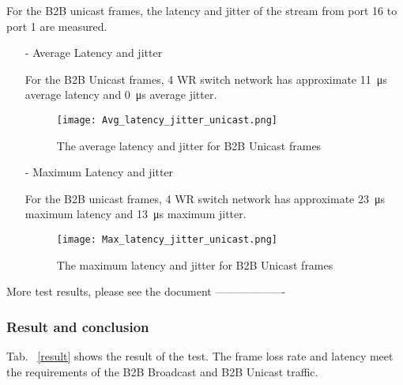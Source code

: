 \begin{itemize}
For the B2B unicast frames, the latency and jitter of the stream from port 16 to port 1 are measured. 

		\begin{itemize}
    		\item[-] Average Latency and jitter

For the B2B Unicast frames, 4 WR switch network has approximate \SI{11}{\us} average latency and \SI{0}{\us} average jitter. 

\begin{figure}[!htb]
   \centering   
   \texttt{[image: Avg\_latency\_jitter\_unicast.png]}
   \caption{The average latency and jitter for B2B Unicast frames}
   \label{Avg_latency_jitter_unicast}
\end{figure}

			\item[-] Maximum Latency and jitter

For the B2B unicast frames, 4 WR switch network has approximate \SI{23}{\us} maximum latency and \SI{13}{\us} maximum jitter.

\begin{figure}[!htb]
   \centering   
   \texttt{[image: Max\_latency\_jitter\_unicast.png]}
   \caption{The maximum latency and jitter for B2B Unicast frames}
   \label{Max_latency_jitter_unicast}
\end{figure}

		\end{itemize}
\end{itemize}

More test results, please see the document -------------------

\subsubsection{Result and conclusion}

Tab. ~\ref{result} shows the result of the test. The frame loss rate and latency meet the requirements of the B2B Broadcast and B2B Unicast traffic. 

